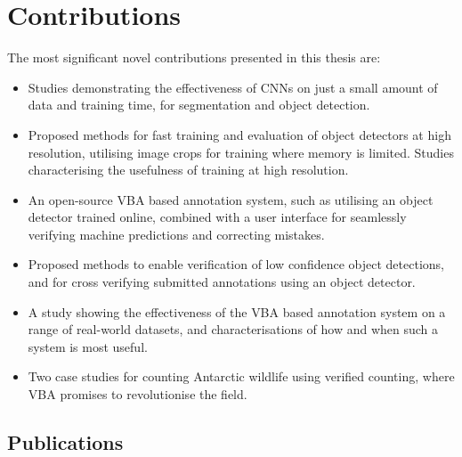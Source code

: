 \section {Contributions}
\label{sec: contributions}

The most significant novel contributions presented in this thesis are:

\begin{itemize}

    
    \item Studies demonstrating the effectiveness of \gls{CNN}s on just a small amount of data and training time, for segmentation and object detection.
    
    \item Proposed methods for fast training and evaluation of object detectors at high resolution, utilising image crops for training where memory is limited. Studies characterising the usefulness of training at high resolution.
    
    \item An open-source \gls{VBA} based annotation system, such as utilising an object detector trained online, combined with a user interface for seamlessly verifying machine predictions and correcting mistakes.
    
    \item Proposed methods to enable verification of low confidence object detections, and for cross verifying submitted annotations using an object detector.
    
    \item A study showing the effectiveness of the \gls{VBA} based annotation system on a range of real-world datasets, and characterisations of how and when such a system is most useful.
    
    \item Two case studies for counting Antarctic wildlife using verified counting, where \gls{VBA} promises to revolutionise the field. 
    
\end{itemize}

\subsection {Publications}
\label{sec: publications}

